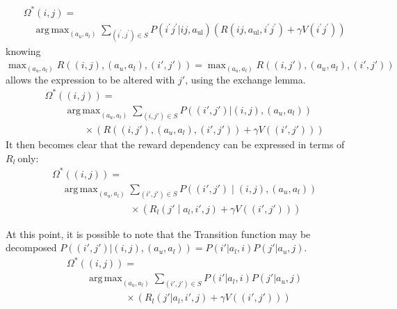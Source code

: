 \documentclass[compsoc,journal,letterpaper,10pt,draftcls,twocolumn]{IEEEtran}
\DeclareMathOperator*{\argmax}{arg\,max}
\begin{document}
\begin{align}
& \Omega^{\ast}(i,j) = \nonumber \\ & \quad \argmax_{\left( a_{u}, a_{l} \right)}\sum_{\left( i^{\prime}, j^{\prime} \right) \in S}
P\left( i^{\prime}j^{\prime}| ij, a_{\text{ul}} \right)\left( R\left( ij,a_{\text{ul}},i^{\prime}j^{\prime} \right) + \gamma V\left( i^{\prime}j^{\prime} \right) \right)
\end{align}
knowing
\(  \max_{\left(a_{u},a_{l}\right)}R\left( \left( i,j \right),\left( a_{u},a_{l} \right),\left( i',j' \right) \right) = \max_{\left(a_{u},a_{l}\right)}R\left( \left( i,j' \right),\left( a_{u},a_{l} \right),\left( i',j' \right) \right)\)
allows the expression to be altered with \(j'\), using the exchange
lemma.
\begin{align}
& \Omega^{\ast}(\left( i,j \right)) = \nonumber \\ 
& \qquad \argmax_{\left(a_{u},a_{l}\right)}\sum_{\left( i,j' \right) \in S}
P\left( \left( i',j' \right)|\left( i,j \right),\left( a_{u},a_{l} \right) \right) \nonumber \\
& \qquad\qquad \times\left( R\left( \left( i,j' \right),\left( a_{u},a_{l} \right),\left( i',j' \right) \right) + \gamma V\left( \left( i',j' \right) \right) \right)
\end{align}
It then becomes clear that the reward dependency can be expressed in
terms of \(R_{l}\ \)only:
\begin{align}
& \Omega^{\ast}(\left( i,j \right)) = \nonumber \\ 
& \quad \argmax_{\left(a_{u}, a_{l}\right)} \sum_{\left( i',j' \right) \in S}
P\left( \left( i',j' \right) \middle| \left( i,j \right),\left( a_{u},a_{l} \right) \right)  \\
& \qquad\qquad \qquad \qquad \times
\left( R_{l}\left( j' \middle| a_{l},i',j \right) + \gamma V\left( \left( i',j' \right) \right) \right) \nonumber
\end{align}

At this point, it is possible to note that the Transition function may
be decomposed
\(P\left( \left( i',j' \right)|\left( i,j \right),\left( a_{u},a_{l} \right) \right) = P\left( i'|a_{l},i \right)P\left( j'|a_{u},j \right)\).
\begin{align} 
& \Omega^{\ast}(\left( i,j \right)) = \nonumber \\ 
& \qquad \argmax_{\left(a_{u},a_{l}\right)}\sum_{\left( i',j' \right) \in S} P\left( i'|a_{l},i \right) P\left( j'|a_{u},j \right) \\
& \qquad \qquad\qquad \times
 \left( R_{l}\left( j'|a_{l},i',j \right) + \gamma V\left( \left( i',j' \right) \right) \right) \nonumber
\end{align} 
\end{document}
